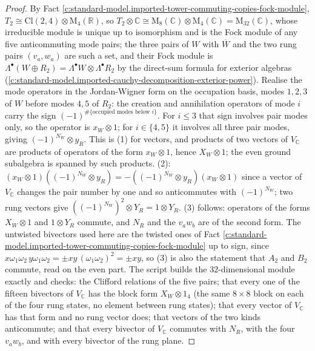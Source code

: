 \documentclass[11pt]{article}
\theoremstyle{definition}
\theoremstyle{plain}
\providecommand{\C}{}\renewcommand{\C}{\mathbb{C}}
\providecommand{\Cl}{}\renewcommand{\Cl}{\mathrm{Cl}}
\providecommand{\R}{}\renewcommand{\R}{\mathbb{R}}
\begin{document}
\begin{proof}
By Fact \ref{c:standard-model.imported-tower-commuting-copies-fock-module}, $T_{2} \cong \Cl(2,4) \otimes \mathrm{M}_{4}(\R)$, so $T_{2} \otimes \C \cong \mathrm{M}_{8}(\C) \otimes \mathrm{M}_{4}(\C) = \mathrm{M}_{32}(\C)$, whose irreducible module is unique up to isomorphism and is the Fock module of any five anticommuting mode pairs; the three pairs of $W$ with $\overline{W}$ and the two rung pairs $(v_{a}, w_{a})$ are such a set, and their Fock module is $\Lambda^{\bullet}(W \oplus R_{2}) = \Lambda^{\bullet}W \otimes \Lambda^{\bullet}R_{2}$ by the direct-sum formula for exterior algebras \cite[App.~B.2]{FultonHarris1991} (\ref{c:standard-model.imported-cauchy-decomposition-exterior-power}). Realise the mode operators in the Jordan-Wigner form on the occupation basis, modes $1, 2, 3$ of $W$ before modes $4, 5$ of $R_{2}$: the creation and annihilation operators of mode $i$ carry the sign $(-1)^{\#\{\text{occupied modes below } i\}}$. For $i \le 3$ that sign involves pair modes only, so the operator is $x_{W} \otimes 1$; for $i \in \{4, 5\}$ it involves all three pair modes, giving $(-1)^{N_{W}} \otimes y_{R}$. This is (1) for vectors, and products of two vectors of $V_{\C}$ are products of operators of the form $x_{W} \otimes 1$, hence $X_{W} \otimes 1$; the even ground subalgebra is spanned by such products. (2): $(x_{W} \otimes 1)((-1)^{N_{W}} \otimes y_{R}) = -((-1)^{N_{W}} \otimes y_{R})(x_{W} \otimes 1)$ since a vector of $V_{\C}$ changes the pair number by one and so anticommutes with $(-1)^{N_{W}}$; two rung vectors give $((-1)^{N_{W}})^{2} \otimes Y_{R} = 1 \otimes Y_{R}$. (3) follows: operators of the forms $X_{W} \otimes 1$ and $1 \otimes Y_{R}$ commute, and $N_{R}$ and the $v_{a}w_{b}$ are of the second form. The untwisted bivectors used here are the twisted ones of Fact \ref{c:standard-model.imported-tower-commuting-copies-fock-module} up to sign, since $x\omega_{1}\omega_{2}\,y\omega_{1}\omega_{2} = \pm xy\,(\omega_{1}\omega_{2})^{2} = \pm xy$, so (3) is also the statement that $A_{2}$ and $B_{2}$ commute, read on the even part. The script builds the $32$-dimensional module exactly and checks: the Clifford relations of the five pairs; that every one of the fifteen bivectors of $V_{\C}$ has the block form $X_{W} \otimes 1_{4}$ (the same $8 \times 8$ block on each of the four rung states, no element between rung states); that every vector of $V_{\C}$ has that form and no rung vector does; that vectors of the two kinds anticommute; and that every bivector of $V_{\C}$ commutes with $N_{R}$, with the four $v_{a}w_{b}$, and with every bivector of the rung plane.

\end{proof}
\end{document}
